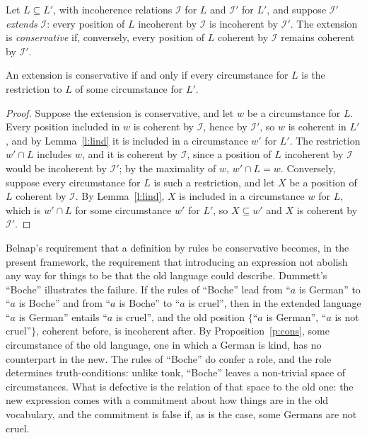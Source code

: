 \documentclass{situationist-preprint}
\begin{document}
Let $L \subseteq L'$, with incoherence relations $\mathcal{I}$ for $L$ and $\mathcal{I}'$ for $L'$, and suppose $\mathcal{I}'$ \emph{extends} $\mathcal{I}$: every position of $L$ incoherent by $\mathcal{I}$ is incoherent by $\mathcal{I}'$. The extension is \emph{conservative} if, conversely, every position of $L$ coherent by $\mathcal{I}$ remains coherent by $\mathcal{I}'$.

\begin{proposition}[Conservativeness]\label{p:cons}
An extension is conservative if and only if every circumstance for $L$ is the restriction to $L$ of some circumstance for $L'$.
\end{proposition}

\begin{proof}
Suppose the extension is conservative, and let $w$ be a circumstance for $L$. Every position included in $w$ is coherent by $\mathcal{I}$, hence by $\mathcal{I}'$, so $w$ is coherent in $L'$, and by Lemma~\ref{l:lind} it is included in a circumstance $w'$ for $L'$. The restriction $w' \cap L$ includes $w$, and it is coherent by $\mathcal{I}$, since a position of $L$ incoherent by $\mathcal{I}$ would be incoherent by $\mathcal{I}'$; by the maximality of $w$, $w' \cap L = w$. Conversely, suppose every circumstance for $L$ is such a restriction, and let $X$ be a position of $L$ coherent by $\mathcal{I}$. By Lemma~\ref{l:lind}, $X$ is included in a circumstance $w$ for $L$, which is $w' \cap L$ for some circumstance $w'$ for $L'$, so $X \subseteq w'$ and $X$ is coherent by $\mathcal{I}'$.
\end{proof}

Belnap's requirement that a definition by rules be conservative becomes, in the present framework, the requirement that introducing an expression not abolish any way for things to be that the old language could describe. Dummett's \enquote{Boche} illustrates the failure. If the rules of \enquote{Boche} lead from \enquote{$a$ is German} to \enquote{$a$ is Boche} and from \enquote{$a$ is Boche} to \enquote{$a$ is cruel}, then in the extended language \enquote{$a$ is German} entails \enquote{$a$ is cruel}, and the old position $\{$\enquote{$a$ is German}, \enquote{$a$ is not cruel}$\}$, coherent before, is incoherent after. By Proposition~\ref{p:cons}, some circumstance of the old language, one in which a German is kind, has no counterpart in the new. The rules of \enquote{Boche} do confer a role, and the role determines truth-conditions: unlike tonk, \enquote{Boche} leaves a non-trivial space of circumstances. What is defective is the relation of that space to the old one: the new expression comes with a commitment about how things are in the old vocabulary, and the commitment is false if, as is the case, some Germans are not cruel.
\end{document}
